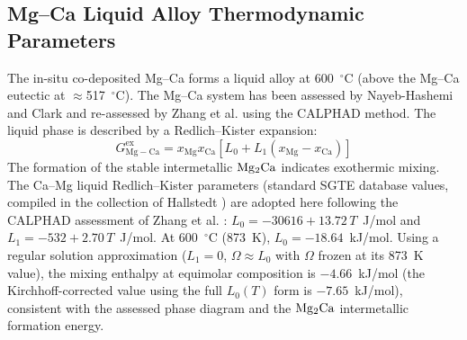 \documentclass[11pt]{article}
\begin{document}
\subsection*{Mg--Ca Liquid Alloy Thermodynamic Parameters}
\label{subsec:MgCa}

The in-situ co-deposited Mg--Ca forms a liquid alloy at 600~$^{\circ}$C (above the Mg--Ca eutectic at $\approx$517~$^{\circ}$C). The Mg--Ca system has been assessed by Nayeb-Hashemi and Clark \cite{nayeb1987} and re-assessed by Zhang et al. \cite{zhang2008mgce} using the CALPHAD method. The liquid phase is described by a Redlich--Kister expansion:
\begin{equation}
\label{eq:rk}
G^{\mathrm{ex}}_{\mathrm{Mg-Ca}} = x_{\mathrm{Mg}}x_{\mathrm{Ca}}\left[L_0 + L_1(x_{\mathrm{Mg}}-x_{\mathrm{Ca}})\right]
\end{equation}
The formation of the stable intermetallic $\ce{Mg2Ca}$ indicates exothermic mixing. The Ca--Mg liquid Redlich--Kister parameters (standard SGTE database values, compiled in the collection of Hallstedt \cite{hallstedt2025}) are adopted here following the CALPHAD assessment of Zhang et al. \cite{zhang2008mgce}: $L_0 = -30616 + 13.72\,T$~J/mol and $L_1 = -532 + 2.70\,T$~J/mol. At 600~$^{\circ}$C (873~K), $L_0 = -18.64$~kJ/mol. Using a regular solution approximation ($L_1 = 0$, $\Omega \approx L_0$ with $\Omega$ frozen at its 873~K value), the mixing enthalpy at equimolar composition is $-4.66$~kJ/mol (the Kirchhoff-corrected value using the full $L_0(T)$ form is $-7.65$~kJ/mol), consistent with the assessed phase diagram and the $\ce{Mg2Ca}$ intermetallic formation energy.
\end{document}
